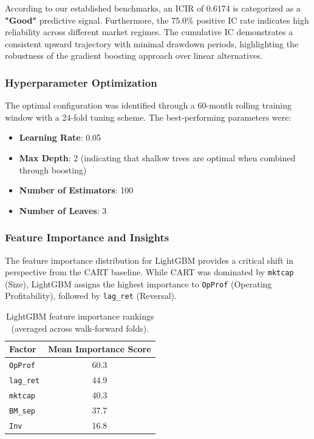 \documentclass[11pt]{article}
\begin{document}
According to our established benchmarks, an ICIR of 0.6174 is categorized as a \textbf{"Good"} predictive signal. Furthermore, the 75.0\% positive IC rate indicates high reliability across different market regimes. The cumulative IC demonstrates a consistent upward trajectory with minimal drawdown periods, highlighting the robustness of the gradient boosting approach over linear alternatives.

\subsubsection{Hyperparameter Optimization}
The optimal configuration was identified through a 60-month rolling training window with a 24-fold tuning scheme. The best-performing parameters were:
\begin{itemize}
    \item \textbf{Learning Rate}: 0.05
    \item \textbf{Max Depth}: 2 (indicating that shallow trees are optimal when combined through boosting)
    \item \textbf{Number of Estimators}: 100
    \item \textbf{Number of Leaves}: 3
\end{itemize}

\subsubsection{Feature Importance and Insights}
The feature importance distribution for LightGBM provides a critical shift in perspective from the CART baseline. While CART was dominated by \texttt{mktcap} (Size), LightGBM assigns the highest importance to \texttt{OpProf} (Operating Profitability), followed by \texttt{lag\_ret} (Reversal).

\begin{table}[H]
\centering
\begin{tabular}{lc}
\toprule
\textbf{Factor} & \textbf{Mean Importance Score} \\
\midrule
\texttt{OpProf}   & 60.3 \\
\texttt{lag\_ret} & 44.9 \\
\texttt{mktcap}   & 40.3 \\
\texttt{BM\_sep}  & 37.7 \\
\texttt{Inv}      & 16.8 \\
\bottomrule
\end{tabular}
\caption{LightGBM feature importance rankings (averaged across walk-forward folds).}
\label{tab:lgbm_importance}
\end{table}
\end{document}
